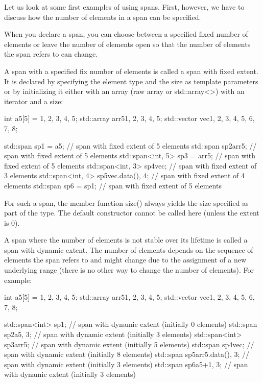 
Let us look at some first examples of using spans. First, however, we have to discuss how the number of elements in a span can be specified.


When you declare a span, you can choose between a specified fixed number of elements or leave the number of elements open so that the number of elements the span refers to can change.

A span with a specified fix number of elements is called a span with fixed extent. It is declared by specifying the element type and the size as template parameters or by initializing it either with an array (raw array or std::array<>) with an iterator and a size:

\begin{cpp}
int a5[5] = {1, 2, 3, 4, 5};
std::array arr5{1, 2, 3, 4, 5};
std::vector vec{1, 2, 3, 4, 5, 6, 7, 8};

std::span sp1 = a5; // span with fixed extent of 5 elements
std::span sp2{arr5}; // span with fixed extent of 5 elements
std::span<int, 5> sp3 = arr5; // span with fixed extent of 5 elements
std::span<int, 3> sp4{vec}; // span with fixed extent of 3 elements
std::span<int, 4> sp5{vec.data(), 4}; // span with fixed extent of 4 elements
std::span sp6 = sp1; // span with fixed extent of 5 elements
\end{cpp}

For such a span, the member function size() always yields the size specified as part of the type. The default constructor cannot be called here (unless the extent is 0).

A span where the number of elements is not stable over its lifetime is called a span with dynamic extent. The number of elements depends on the sequence of elements the span refers to and might change due to the assignment of a new underlying range (there is no other way to change the number of elements). For example:

\begin{cpp}
int a5[5] = {1, 2, 3, 4, 5};
std::array arr5{1, 2, 3, 4, 5};
std::vector vec{1, 2, 3, 4, 5, 6, 7, 8};

std::span<int> sp1; // span with dynamic extent (initially 0 elements)
std::span sp2{a5, 3}; // span with dynamic extent (initially 3 elements)
std::span<int> sp3{arr5}; // span with dynamic extent (initially 5 elements)
std::span sp4{vec}; // span with dynamic extent (initially 8 elements)
std::span sp5{arr5.data(), 3}; // span with dynamic extent (initially 3 elements)
std::span sp6{a5+1, 3}; // span with dynamic extent (initially 3 elements)
\end{cpp}

